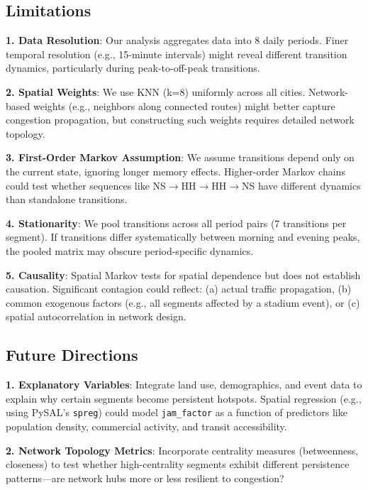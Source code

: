 \documentclass[11pt,a4paper]{article}
\begin{document}
\subsection{Limitations}

\textbf{1. Data Resolution}: Our analysis aggregates data into 8 daily periods. Finer temporal resolution (e.g., 15-minute intervals) might reveal different transition dynamics, particularly during peak-to-off-peak transitions.

\textbf{2. Spatial Weights}: We use KNN (k=8) uniformly across all cities. Network-based weights (e.g., neighbors along connected routes) might better capture congestion propagation, but constructing such weights requires detailed network topology.

\textbf{3. First-Order Markov Assumption}: We assume transitions depend only on the current state, ignoring longer memory effects. Higher-order Markov chains could test whether sequences like NS$\rightarrow$HH$\rightarrow$HH$\rightarrow$NS have different dynamics than standalone transitions.

\textbf{4. Stationarity}: We pool transitions across all period pairs (7 transitions per segment). If transitions differ systematically between morning and evening peaks, the pooled matrix may obscure period-specific dynamics.

\textbf{5. Causality}: Spatial Markov tests for spatial dependence but does not establish causation. Significant contagion could reflect: (a) actual traffic propagation, (b) common exogenous factors (e.g., all segments affected by a stadium event), or (c) spatial autocorrelation in network design.

\subsection{Future Directions}

\textbf{1. Explanatory Variables}: Integrate land use, demographics, and event data to explain why certain segments become persistent hotspots. Spatial regression (e.g., using PySAL's \texttt{spreg}) could model \texttt{jam\_factor} as a function of predictors like population density, commercial activity, and transit accessibility.

\textbf{2. Network Topology Metrics}: Incorporate centrality measures (betweenness, closeness) to test whether high-centrality segments exhibit different persistence patterns---are network hubs more or less resilient to congestion?
\end{document}
